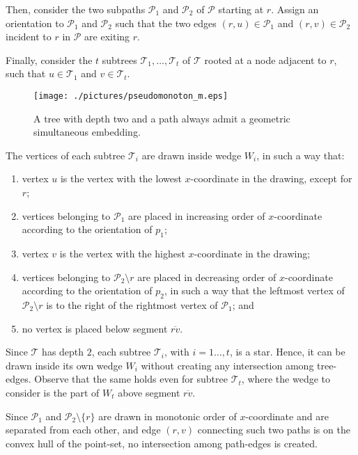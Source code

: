 \documentclass[a4paper,10pt]{llncs}
\begin{document}
Then, consider the two subpaths $\mathcal{P}_1$ and $\mathcal{P}_2$ of $\mathcal{P}$ starting at $r$. Assign an orientation to $\mathcal{P}_1$ and $\mathcal{P}_2$ such that the two edges $(r,u) \in \mathcal{P}_1$ and $(r,v) \in \mathcal{P}_2$ incident to $r$ in $\mathcal{P}$ are exiting $r$.

Finally, consider the $t$ subtrees $\mathcal{T}_1, \ldots, \mathcal{T}_t$ of $\mathcal{T}$ rooted at a node adjacent to $r$, such that $u \in \mathcal{T}_1$ and $v \in \mathcal{T}_t$.

\begin{figure}[h]
\begin{center}
\texttt{[image: ./pictures/pseudomonoton\_m.eps]}
\caption{A tree with depth two and a path always admit a geometric simultaneous embedding.}
\label{fig:pseudo}
\end{center}
\end{figure}

The vertices of each subtree $\mathcal{T}_i$ are drawn inside wedge $W_i$, in such a way that:
\begin{enumerate}
\item vertex $u$ is the vertex with the lowest $x$-coordinate in the drawing, except for $r$;
\item vertices belonging to $\mathcal{P}_1$ are placed in increasing order of $x$-coordinate according to the orientation of $p_1$;
\item vertex $v$ is the vertex with the highest $x$-coordinate in the drawing;
\item vertices belonging to $\mathcal{P}_2 \setminus r$ are placed in decreasing order of $x$-coordinate according to the orientation of $p_2$, in such a way that the leftmost vertex of $\mathcal{P}_2 \setminus r$ is to the right of the rightmost vertex of $\mathcal{P}_1$; and
\item no vertex is placed below segment $\overline{rv}$.
\end{enumerate}

Since $\mathcal{T}$ has depth $2$, each subtree $\mathcal{T}_i$, with $i=1\ldots,t$, is a star. Hence, it can be drawn inside its own wedge $W_i$ without creating any intersection among tree-edges. Observe that the same holds even for subtree $\mathcal{T}_t$, where the wedge to consider is the part of $W_t$ above segment $\overline{rv}$.

Since $\mathcal{P}_1$ and $\mathcal{P}_2 \setminus \{r\}$ are drawn in monotonic order of $x$-coordinate and are separated from each other, and edge $(r,v)$ connecting such two paths is on the convex hull of the point-set, no intersection among path-edges is created.
\end{document}
